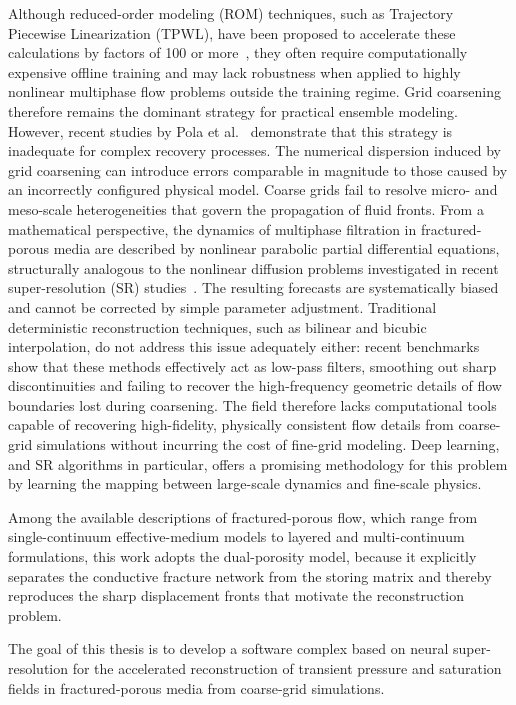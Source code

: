 Although reduced-order modeling (ROM) techniques, such as Trajectory Piecewise Linearization (TPWL), have been proposed to accelerate these calculations by factors of 100 or more~\cite{rom_review_spe}, they often require computationally expensive offline training and may lack robustness when applied to highly nonlinear multiphase flow problems outside the training regime. Grid coarsening therefore remains the dominant strategy for practical ensemble modeling. However, recent studies by Pola et al.~\cite{geological_heterogeneity_impact} demonstrate that this strategy is inadequate for complex recovery processes. The numerical dispersion induced by grid coarsening can introduce errors comparable in magnitude to those caused by an incorrectly configured physical model. Coarse grids fail to resolve micro- and meso-scale heterogeneities that govern the propagation of fluid fronts. From a mathematical perspective, the dynamics of multiphase filtration in fractured-porous media are described by nonlinear parabolic partial differential equations, structurally analogous to the nonlinear diffusion problems investigated in recent super-resolution (SR) studies~\cite{konyukhov_article}. The resulting forecasts are systematically biased and cannot be corrected by simple parameter adjustment. Traditional deterministic reconstruction techniques, such as bilinear and bicubic interpolation, do not address this issue adequately either: recent benchmarks~\cite{konyukhov_article} show that these methods effectively act as low-pass filters, smoothing out sharp discontinuities and failing to recover the high-frequency geometric details of flow boundaries lost during coarsening. The field therefore lacks computational tools capable of recovering high-fidelity, physically consistent flow details from coarse-grid simulations without incurring the cost of fine-grid modeling. Deep learning, and SR algorithms in particular, offers a promising methodology for this problem by learning the mapping between large-scale dynamics and fine-scale physics.

Among the available descriptions of fractured-porous flow, which range from single-continuum effective-medium models to layered and multi-continuum formulations, this work adopts the dual-porosity model, because it explicitly separates the conductive fracture network from the storing matrix and thereby reproduces the sharp displacement fronts that motivate the reconstruction problem.

The goal of this thesis is to develop a software complex based on neural super-resolution for the accelerated reconstruction of transient pressure and saturation fields in fractured-porous media from coarse-grid simulations.

